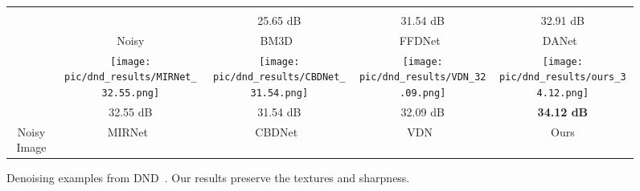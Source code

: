 \documentclass[final]{cvpr}
\begin{document}
\begin{figure*}[h]
\begin{center}
{\begin{tabular}[b]{c@{ } c@{ }  c@{ } c@{ } c@{ }	}
     
    \vspace{0.5mm}
\\
    &      &25.65 dB  & 31.54 dB
    & 32.91 dB\\
    & Noisy &BM3D~\cite{dabov2007image} &  FFDNet~\cite{zhang2018ffdnet} & DANet~\cite{yue2020dual}
    \\
    &\texttt{[image: pic/dnd\_results/MIRNet\_32.55.png]}  
    &\texttt{[image: pic/dnd\_results/CBDNet\_31.54.png]}&
     \texttt{[image: pic/dnd\_results/VDN\_32.09.png]}&
     \texttt{[image: pic/dnd\_results/ours\_34.12.png]}
     \vspace{0.5mm}
     \\

      & 32.55 dB 
     & 31.54 dB
     & 32.09 dB & \textbf{34.12 dB}\\
           Noisy Image  & MIRNet~\cite{zamir2020learning} & CBDNet~\cite{guo2018toward}  
           & VDN~\cite{yue2019variational}     & Ours \\
\end{tabular}}
\end{center}
\vspace{-6mm}
\caption{\small Denoising examples from DND~\cite{plotz2017benchmarking}. Our results preserve the textures and sharpness. }
\label{fig:dnd example}
\end{figure*} \begin{table*}[t]
    \setlength{\tabcolsep}{2.5pt}
    \centering
    {
    }
    \vspace*{-2mm}\caption{\small Denoising comparisons on the DND~\cite{plotz2017benchmarking} dataset.}
     \label{table:dnd-result}
 \end{table*} 
\end{document}
